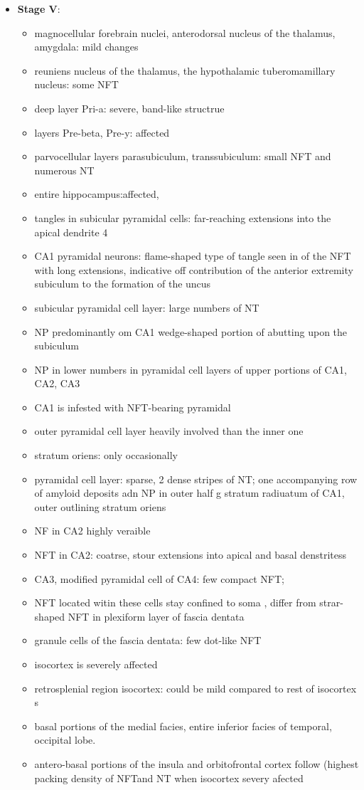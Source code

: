 \documentclass[fleqn]{article}\usepackage{caption}
\begin{document}
\begin{itemize}
\begin{itemize}
\begin{itemize}
\end{itemize}

\item \textbf{Stage V}:
\begin{itemize}
\item magnocellular forebrain nuclei, anterodorsal nucleus of the thalamus, amygdala: mild changes
\item reuniens nucleus of the thalamus, the hypothalamic tuberomamillary nucleus: some NFT
\item deep layer Pri-a: severe, band-like structrue
\item layers Pre-beta, Pre-y: affected
\item parvocellular layers parasubiculum, transsubiculum: small NFT and numerous NT
\item entire hippocampus:affected,
\item tangles in subicular pyramidal cells: far-reaching extensions into the apical dendrite 4
\item CA1 pyramidal neurons: flame-shaped type of tangle seen in of the  NFT with long extensions, indicative off contribution of the anterior extremity subiculum to the formation of the uncus 
\item subicular pyramidal cell layer: large numbers of NT
\item NP predominantly om CA1 wedge-shaped portion of abutting upon the subiculum
\item NP in lower numbers in  pyramidal cell layers of upper portions of CA1, CA2, CA3
\item CA1 is infested with NFT-bearing pyramidal 
\item outer pyramidal cell layer heavily involved than the inner one
\item stratum oriens: only occasionally
\item pyramidal cell layer: sparse, 2 dense stripes of NT; one accompanying row of amyloid deposits adn NP in outer half g stratum radiuatum of CA1, outer outlining stratum oriens
\item NF in CA2 highly veraible
\item NFT in CA2: coatrse, stour extensions into apical and basal denstritess
\item CA3, modified pyramidal cell of CA4: few compact NFT; 
\item NFT located witin these cells stay confined to soma , differ from strar-shaped NFT in plexiform layer of fascia dentata
\item granule cells of the fascia dentata: few dot-like NFT 
\item isocortex is severely affected
\item retrosplenial region isocortex: could be mild compared to rest of isocortex s
\item basal portions of the medial facies, entire inferior facies of temporal, occipital lobe. 
\item antero-basal portions of the insula and orbitofrontal cortex follow
(highest packing density of NFTand NT when isocortex severy afected 


\end{itemize}
\end{itemize}
\end{itemize}
\end{document}
